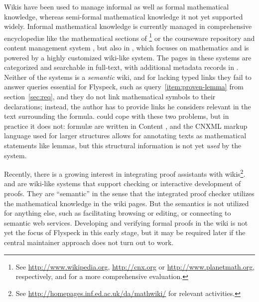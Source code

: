 Wikis have been used to manage informal as well as formal mathematical knowledge, whereas
semi-formal mathematical knowledge it not yet supported widely.
Informal mathematical knowledge is currently managed in comprehensive encyclopediæ like
the mathematical sections of \footnote{See
  \url{http://www.wikipedia.org}, \url{http://cnx.org} or \url{http://www.planetmath.org},
  respectively, and\cite{Lange:swmkm-tr07} for a more comprehensive evaluation.} or the
courseware repository and content management system
\footnotemark[\value{footnote}], but also in
\footnotemark[\value{footnote}], which focuses on mathematics and is
powered by a highly customized wiki-like system.  The pages in these systems are
categorized and searchable in full-text, with additional metadata records in
.  Neither of the systems is a \emph{semantic} wiki, and for lacking
typed links they fail to answer queries essential for Flyspeck, such as
query~\ref{item:proven-lemma} from section~\ref{sec:req}, and they do not link
mathematical symbols to their declarations; instead, the author has to provide links he
considers relevant in the text surrounding the formula.   could cope
with these two problems, but in practice it does not: formulæ are written in Content
{\mathml}\cite{CarlisleEd:MathML07}, and the CNXML markup language used for larger
structures allows for annotating texts as mathematical statements like
lemmas\cite{connexions05:cnxml}, but this structural information is not yet \emph{used}
by the system.

Recently, there is a growing interest in integrating proof assistants
with wikis\footnote{See
  \url{http://homepages.inf.ed.ac.uk/da/mathwiki/} for relevant
  activities.}.   and  are
wiki-like systems that support checking or interactive development of
proofs. They are ``semantic'' in the sense that the integrated proof
checker utilizes the mathematical knowledge in the wiki pages.  But
the semantics is not utilized for anything else, such as facilitating
browsing or editing, or connecting to semantic web services.
Developing and verifying formal proofs in the wiki is not yet the
focus of Flyspeck in this early stage, but it may be required later if
the central maintainer approach does not turn out to
work.

